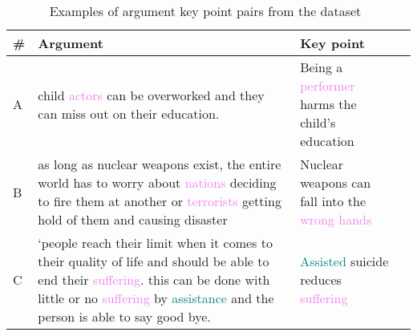 \begin{table*}
    \caption{Examples of  argument key point pairs from the \ArgKP dataset~\cite{Bar-HaimEFKLS2020}}
    \label{examples}
    \begin{tabularx}{\linewidth}{lXp{4.3cm}c}
      \toprule
      \textbf{\#} & \textbf{Argument} & \textbf{Key point} \\
      \midrule
      A & %
      child \textcolor{violet}{actors} can be overworked and they can miss out on their education. & %
      Being a \textcolor{violet}{performer} harms the child's education \\ %
      B & %
      as long as nuclear weapons exist, the entire world has to worry about \textcolor{violet}{nations} deciding to fire them at another or \textcolor{violet}{terrorists} getting hold of them and causing disaster & %
      Nuclear weapons can fall into the \textcolor{violet}{wrong hands} \\ %
      C & %
      `people reach their limit when it comes to their quality of life and should be able to end their \textcolor{violet}{suffering}. this can be done with little or no \textcolor{violet}{suffering} by \textcolor{teal}{assistance} and the person is able to say good bye. & %
      \textcolor{teal}{Assisted} suicide reduces \textcolor{violet}{suffering} \\ %
      \bottomrule
    \end{tabularx}
  \end{table*}
